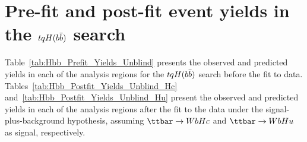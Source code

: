 \section{Pre-fit and post-fit event yields in the $tqH(b\bar{b})$ search}
\label{sec:prepostfit_yields_Hbb_appendix}

Table~\ref{tab:Hbb_Prefit_Yields_Unblind} presents the observed and predicted yields in each of the analysis regions 
for the $tqH(b\bar{b})$ search before the fit to data. 
Tables~\ref{tab:Hbb_Postfit_Yields_Unblind_Hc} and~\ref{tab:Hbb_Postfit_Yields_Unblind_Hu} present the observed and predicted yields 
in each of the analysis regions after the fit to the data under the signal-plus-background hypothesis, assuming 
$\Hc$ and $\Hu$ as signal, respectively.

